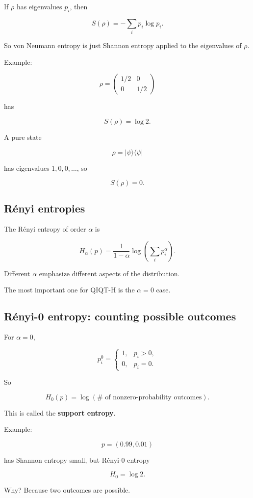 \documentclass[11pt,a4paper]{article}
\begin{document}
If $\rho$ has eigenvalues $p_i$, then

\[
S(\rho) = -\sum_i p_i \log p_i.
\]

So von Neumann entropy is just Shannon entropy applied to the eigenvalues of $\rho$.

Example:

\[
\rho =
\begin{pmatrix}
1/2 & 0 \\
0 & 1/2
\end{pmatrix}
\]

has

\[
S(\rho)=\log 2.
\]

A pure state

\[
\rho=|\psi\rangle\langle\psi|
\]

has eigenvalues $1,0,0,\dots$, so

\[
S(\rho)=0.
\]

\subsection{Rényi entropies}

The Rényi entropy of order $\alpha$ is

\[
H_\alpha(p)=\frac{1}{1-\alpha}\log\left(\sum_i p_i^\alpha\right).
\]

Different $\alpha$ emphasize different aspects of the distribution.

The most important one for QIQT-H is the $\alpha=0$ case.

\subsection{Rényi-0 entropy: counting possible outcomes}

For $\alpha=0$,

\[
p_i^0 =
\begin{cases}
1, & p_i>0,\\
0, & p_i=0.
\end{cases}
\]

So

\[
H_0(p)=\log(\#\text{ of nonzero-probability outcomes}).
\]

This is called the \textbf{support entropy}.

Example:

\[
p=(0.99,0.01)
\]

has Shannon entropy small, but Rényi-0 entropy

\[
H_0 = \log 2.
\]

Why? Because two outcomes are possible.
\end{document}
